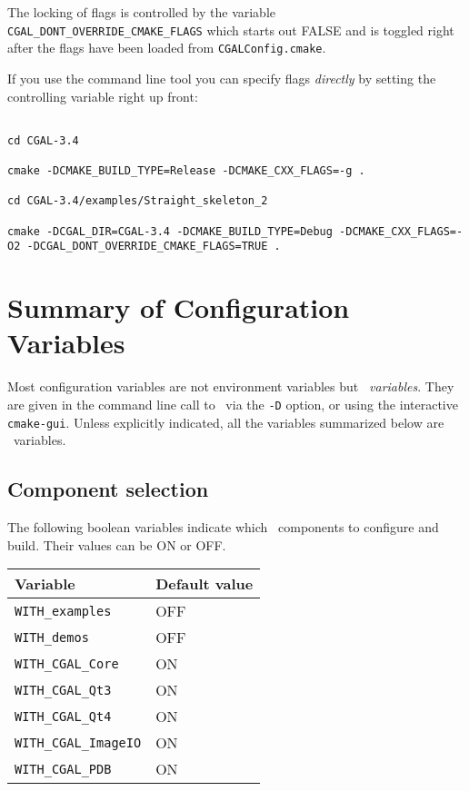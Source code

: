 \begin{ccAdvanced}
The locking of flags is controlled by the variable {\tt CGAL\_DONT\_OVERRIDE\_CMAKE\_FLAGS}
which starts out FALSE and is toggled right after the flags have been loaded from
\texttt{CGALConfig.cmake}.

If you use the command line tool you can specify flags {\em directly} by setting the
controlling variable right up front:

{\ccTexHtml{\scriptsize}{}
\begin{verbatim}

cd CGAL-3.4

cmake -DCMAKE_BUILD_TYPE=Release -DCMAKE_CXX_FLAGS=-g .

cd CGAL-3.4/examples/Straight_skeleton_2

cmake -DCGAL_DIR=CGAL-3.4 -DCMAKE_BUILD_TYPE=Debug -DCMAKE_CXX_FLAGS=-O2 -DCGAL_DONT_OVERRIDE_CMAKE_FLAGS=TRUE . 

\end{verbatim}
}
\end{ccAdvanced}






\section{Summary of Configuration Variables}

Most configuration variables are not environment variables but {\em \cmake\ variables}. They are given in the command line call to \cmake\ via the \texttt{-D} option, 
or using the interactive \texttt{cmake-gui}. Unless explicitly indicated, all the variables summarized below are \cmake\ variables.

\subsection{Component selection}

The following boolean variables indicate which \cgal\ components to configure and build. Their values can be ON or OFF.

\renewcommand{\arraystretch}{1.3}
\gdef\lcTabularBorder{2}
\begin{tabular}{|l|l|} \hline
  \textbf{Variable}            & \textbf{Default value}\\\hline\hline
  \texttt{WITH\_examples}      & OFF\\\hline
  \texttt{WITH\_demos}         & OFF\\\hline
  \texttt{WITH\_CGAL\_Core}    & ON\\\hline
  \texttt{WITH\_CGAL\_Qt3}     & ON\\\hline
  \texttt{WITH\_CGAL\_Qt4}     & ON\\\hline
  \texttt{WITH\_CGAL\_ImageIO} & ON\\\hline
  \texttt{WITH\_CGAL\_PDB}     & ON\\\hline
\end{tabular}

